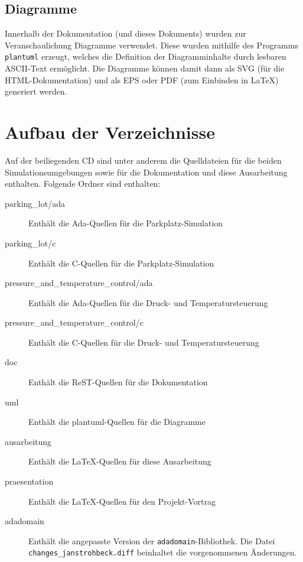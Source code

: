 \documentclass[oneside]{elaboration}
\begin{document}
\subsection{Diagramme}
\label{sec:diagramme}

Innerhalb der Dokumentation (und dieses Dokuments) wurden zur
Veranschaulichung Diagramme verwendet. Diese wurden mithilfe des Programms
\texttt{plantuml} erzeugt, welches die Definition der Diagramminhalte durch
lesbaren ASCII-Text ermöglicht. Die Diagramme können damit dann als SVG (für die
HTML-Dokumentation) und als EPS oder PDF (zum Einbinden in LaTeX) generiert
werden.

\section{Aufbau der Verzeichnisse}
\label{sec:aufbau_der_verzeichnisse}

Auf der beiliegenden CD sind unter anderem die Quelldateien für die beiden
Simulationsumgebungen sowie für die Dokumentation und diese Ausarbeitung
enthalten. Folgende Ordner sind enthalten:

\begin{description}
    \item[parking\_lot/ada] Enthält die Ada-Quellen für die Parkplatz-Simulation
    \item[parking\_lot/c] Enthält die C-Quellen für die Parkplatz-Simulation
    \item[pressure\_and\_temperature\_control/ada] Enthält die Ada-Quellen für die Druck- und Temperatursteuerung 
    \item[pressure\_and\_temperature\_control/c] Enthält die C-Quellen für die Druck- und Temperatursteuerung 
    \item[doc] Enthält die ReST-Quellen für die Dokumentation
    \item[uml] Enthält die plantuml-Quellen für die Diagramme
    \item[ausarbeitung] Enthält die LaTeX-Quellen für diese Ausarbeitung
    \item[praesentation] Enthält die LaTeX-Quellen für den Projekt-Vortrag
    \item[adadomain] Enthält die angepasste Version der
        \texttt{adadomain}-Bibliothek. Die Datei
        \texttt{changes\_janstrohbeck.diff} beinhaltet die vorgenommenen
        Änderungen.
\end{description}

\end{document}
